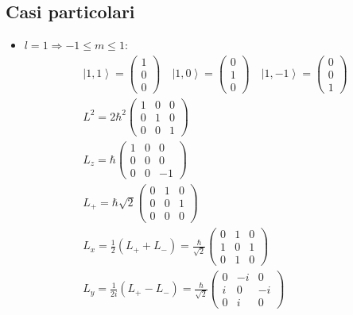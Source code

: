 \subsection{Casi particolari} %
\begin{itemize}
\item $l=1 \Longrightarrow -1\le m \le 1$:
\begin{equation}\begin{split}
\left |1,1 \right\rangle=\left(\begin{matrix}1\\0\\0\end{matrix}\right) \quad \left |1,0 \right\rangle=\left(\begin{matrix}0\\1\\0\end{matrix}\right) \quad \left |1,-1 \right\rangle=\left(\begin{matrix}0\\0\\1\end{matrix}\right) \\
L^2=2\hbar ^2 \left(\begin{matrix}1&0&0\\0&1&0\\0&0&1\end{matrix}\right) \\
L_z=\hbar \left(\begin{matrix}1&0&0\\0&0&0\\0&0&-1\end{matrix}\right) \\
L_+=\hbar \sqrt{2}\left(\begin{matrix}0&1&0\\0&0&1\\0&0&0\end{matrix}\right) \\
L_x=\frac{1}{2}\left(L_++L_-\right)=\frac{\hbar }{\sqrt{2}} \left(\begin{matrix}0&1&0\\1&0&1\\0&1&0\end{matrix}\right) \\
L_y=\frac{1}{2i}\left(L_+-L_-\right)=\frac{\hbar }{\sqrt{2}}\left(\begin{matrix}0&-i&0\\i&0&-i\\0&i&0\end{matrix}\right)

\end{split}
\end{equation}
\end{itemize}
